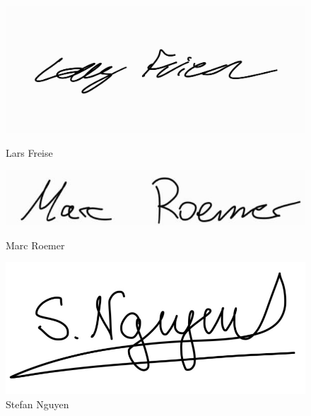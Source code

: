 \documentclass{article}
\begin{document}
\begin{figure}[htbp]
    \vspace{0.5cm}

    \begin{minipage}[b]{0.3\textwidth}
        \centering
        \includegraphics[width=\textwidth]{Jiwon/Lars.jpg}
        \caption{Lars Freise}
    \end{minipage}
    \hfill
    \begin{minipage}[b]{0.3\textwidth}
        \centering
        \includegraphics[width=\textwidth]{Jiwon/Marc.jpg}
        \caption{Marc Roemer}
    \end{minipage}
    \hfill
    \begin{minipage}[b]{0.3\textwidth}
        \centering
        \includegraphics[width=\textwidth]{Jiwon/Stefan.png}
        \caption{Stefan Nguyen}
    \end{minipage}
\end{figure}
\clearpage

\tableofcontents
\clearpage

\end{document}
